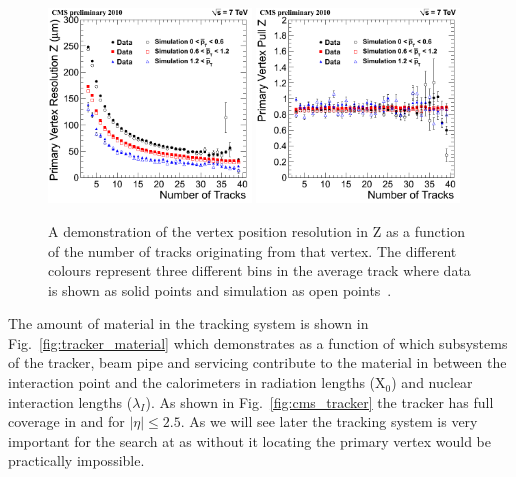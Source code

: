 \begin{figure}
  \includegraphics[width=0.48\textwidth]{cms_experiment/plots/ResZ_byPt.png}
  \includegraphics[width=0.48\textwidth]{cms_experiment/plots/PullZ_byPt.png}
  \caption[Vertex resolution]{A demonstration of the vertex position resolution in Z as a function of the number of tracks originating from that vertex. The different colours represent three different bins in the average track \pT where data is shown as solid points and simulation as open points~\cite{cms-tracker-performance-2010}.}
  \label{fig:tracker_vertex_resolution}
\end{figure}

The amount of material in the tracking system is shown in Fig.~\ref{fig:tracker_material} which demonstrates as a function of \eta which subsystems of the tracker, beam pipe and servicing contribute to the material in between the interaction point and the calorimeters in radiation lengths (X$_{0}$) and nuclear interaction lengths ($\lambda_{I}$). As shown in Fig.~\ref{fig:cms_tracker} the tracker has full coverage in \phi and for $|\eta|\leq2.5$. As we will see later the tracking system is very important for the \Hgg search at \CMS as without it locating the primary vertex would be practically impossible.

